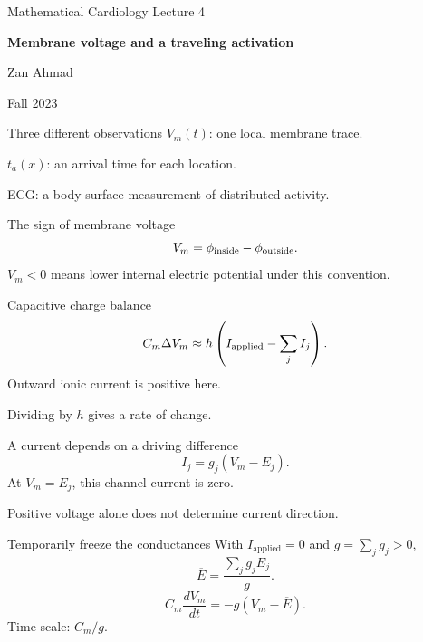 \documentclass[aspectratio=169,11pt]{beamer}
\newcommand{\notestarget}{notes.pdf}\newcommand{\noteslabel}{Notes}
\begin{document}
\begin{frame}[plain]\vfill
{\small\color{accent} Mathematical Cardiology \quad Lecture 4}\par\medskip
{\raggedright{}\LARGE\bfseries\color{ink} Membrane voltage and a traveling activation}\par\bigskip
Zan Ahmad\par\smallskip
{\small Fall 2023}\par\vfill\end{frame}
\renewcommand{\notestarget}{notes.pdf\#note-charge-balance-gives-a-voltage-equation}
\begin{frame}[t,fragile,label=slide-three-different-observations]{Three different observations}
$V_m(t)$: one local membrane trace.\pause{}\par $t_a(x)$: an arrival time for each location.\pause{}\par ECG: a body-surface measurement of distributed activity.
\end{frame}
\renewcommand{\notestarget}{notes.pdf\#note-charge-balance-gives-a-voltage-equation}
\begin{frame}[t,fragile,label=slide-the-sign-of-membrane-voltage]{The sign of membrane voltage}
\[V_m=\phi_{\rm inside}-\phi_{\rm outside}.\]\pause{} $V_m<0$ means lower internal electric potential under this convention.
\end{frame}
\renewcommand{\notestarget}{notes.pdf\#note-charge-balance-gives-a-voltage-equation}
\begin{frame}[t,fragile,label=slide-capacitive-charge-balance]{Capacitive charge balance}
\[C_m\Delta V_m\approx h\left(I_{\rm applied}-\sum_jI_j\right).\]\pause{} Outward ionic current is positive here.\pause{}\par Dividing by $h$ gives a rate of change.
\end{frame}
\renewcommand{\notestarget}{notes.pdf\#note-charge-balance-gives-a-voltage-equation}
\begin{frame}[t,fragile,label=slide-a-current-depends-on-a-driving-difference]{A current depends on a driving difference}
\[I_j=g_j(V_m-E_j).\]\pause{} At $V_m=E_j$, this channel current is zero.\pause{}\par Positive voltage alone does not determine current direction.
\end{frame}
\renewcommand{\notestarget}{notes.pdf\#note-charge-balance-gives-a-voltage-equation}
\begin{frame}[t,fragile,label=slide-temporarily-freeze-the-conductances]{Temporarily freeze the conductances}
With $I_{\mathrm{applied}}=0$ and $g=\sum_j g_j>0$,\[\overline E=\frac{\sum_jg_jE_j}{g}.\]\pause{}\[C_m\frac{dV_m}{dt}=-g(V_m-\overline E).\]\pause{} Time scale: $C_m/g$.
\end{frame}
\end{document}
